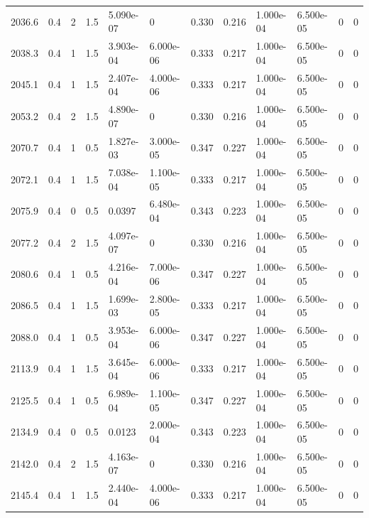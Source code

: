 \documentclass[preview]{standalone}
\begin{document}
{{{\begin{tabular}{L{1.2cm}C{1.2cm} C{0.3cm}C{0.5cm} C{1.4cm}C{1.4cm} C{1.4cm}C{1.4cm} C{1.6cm}C{1.6cm} C{1.6cm}C{1.6cm}}
  2036.6  &   0.4  & 2     & 1.5 &  5.090e-07  & 0  &  0.330&   0.216& 1.000e-04 & 6.500e-05   &  0 & 0  \\ 
  2038.3  &   0.4  & 1     & 1.5 &  3.903e-04  & 6.000e-06  &  0.333&   0.217& 1.000e-04 & 6.500e-05   &  0 & 0  \\ 
  2045.1  &   0.4  & 1     & 1.5 &  2.407e-04  & 4.000e-06  &  0.333&   0.217& 1.000e-04 & 6.500e-05   &  0 & 0  \\ 
  2053.2  &   0.4  & 2     & 1.5 &  4.890e-07  & 0  &  0.330&   0.216& 1.000e-04 & 6.500e-05   &  0 & 0  \\ 
  2070.7  &   0.4  & 1     & 0.5 &  1.827e-03  & 3.000e-05  &  0.347&   0.227& 1.000e-04 & 6.500e-05   &  0 & 0  \\ 
  2072.1  &   0.4  & 1     & 1.5 &  7.038e-04  & 1.100e-05  &  0.333&   0.217& 1.000e-04 & 6.500e-05   &  0 & 0  \\ 
  2075.9  &   0.4  & 0     & 0.5 &  0.0397  & 6.480e-04  &  0.343&   0.223& 1.000e-04 & 6.500e-05   &  0 & 0  \\ 
  2077.2  &   0.4  & 2     & 1.5 &  4.097e-07  & 0  &  0.330&   0.216& 1.000e-04 & 6.500e-05   &  0 & 0  \\ 
  2080.6  &   0.4  & 1     & 0.5 &  4.216e-04  & 7.000e-06  &  0.347&   0.227& 1.000e-04 & 6.500e-05   &  0 & 0  \\ 
  2086.5  &   0.4  & 1     & 1.5 &  1.699e-03  & 2.800e-05  &  0.333&   0.217& 1.000e-04 & 6.500e-05   &  0 & 0  \\ 
  2088.0  &   0.4  & 1     & 0.5 &  3.953e-04  & 6.000e-06  &  0.347&   0.227& 1.000e-04 & 6.500e-05   &  0 & 0  \\ 
  2113.9  &   0.4  & 1     & 1.5 &  3.645e-04  & 6.000e-06  &  0.333&   0.217& 1.000e-04 & 6.500e-05   &  0 & 0  \\ 
  2125.5  &   0.4  & 1     & 0.5 &  6.989e-04  & 1.100e-05  &  0.347&   0.227& 1.000e-04 & 6.500e-05   &  0 & 0  \\ 
  2134.9  &   0.4  & 0     & 0.5 &  0.0123  & 2.000e-04  &  0.343&   0.223& 1.000e-04 & 6.500e-05   &  0 & 0  \\ 
  2142.0  &   0.4  & 2     & 1.5 &  4.163e-07  & 0  &  0.330&   0.216& 1.000e-04 & 6.500e-05   &  0 & 0  \\ 
  2145.4  &   0.4  & 1     & 1.5 &  2.440e-04  & 4.000e-06  &  0.333&   0.217& 1.000e-04 & 6.500e-05   &  0 & 0  \\ 
\hline 
\end{tabular} 

}}}
\end{document}
